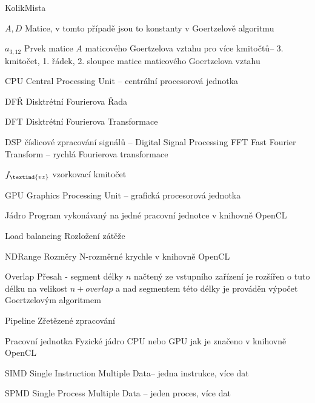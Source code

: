 \begin{seznamzkratek}{KolikMista}

		{$A,D$}								%
		{Matice, v tomto případě jsou to konstanty v Goertzelově algoritmu}		

		{$a_{3,12}$}								%
		{Prvek matice $A$ maticového Goertzelova vztahu pro více kmitočtů-- 3. kmitočet, 1. řádek, 2. sloupec matice maticového Goertzelova vztahu}														

		{CPU}								%
		{Central Processing Unit -- centrální procesorová jednotka}

		{DFŘ}								%
		{Disktrétní Fourierova Řada}		

		{DFT}								%
		{Disktrétní Fourierova Transformace}		

		{DSP}								%
		{číslicové zpracování signálů -- Digital Signal Processing}
		{FFT}								%
		{Fast Fourier Transform -- rychlá Fourierova transformace}

		{\ensuremath{f_\textind{vz}}} %
		{vzorkovací kmitočet}					%


		{GPU}								%
		{Graphics Processing Unit -- grafická procesorová jednotka}

		{Jádro}								%
		{Program vykonávaný na jedné pracovní jednotce v knihovně OpenCL}

		{Load balancing}								%
		{Rozložení zátěže}														

		{NDRange}								%
		{Rozměry N-rozměrné krychle v knihovně OpenCL}

		{Overlap}								%
		{Přesah - segment délky $n$ načtený ze vstupního zařízení je rozšířen o tuto délku na velikost $n + overlap$ a nad segmentem této délky je prováděn výpočet Goertzelovým algoritmem}				

		{Pipeline}								%
		{Zřetězené zpracování}

		{Pracovní jednotka}								%
		{Fyzické jádro CPU nebo GPU jak je značeno v knihovně OpenCL}

		{SIMD}								%
		{Single Instruction Multiple Data-- jedna instrukce, více dat}

		{SPMD}								%
		{Single Process Multiple Data -- jeden proces, více dat}
		
\end{seznamzkratek}
